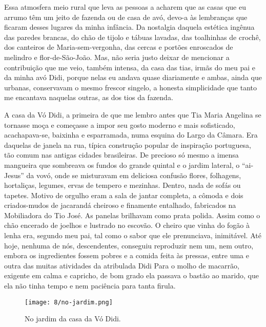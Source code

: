 Essa atmosfera meio rural que leva as pessoas a acharem que as casas que eu arrumo têm um jeito de fazenda ou de casa de avó, devo-a às lembranças que ficaram desses lugares da minha infância.
Da nostalgia daquela estética ingênua das paredes brancas, do chão de tijolo e tábuas lavadas, das toalhinhas de crochê, dos canteiros de Maria-sem-vergonha, das cercas e portões enroscados de melindro e flor-de-São-João.
Mas, não seria justo deixar de mencionar a contribuição que me veio, também intensa, da casa das tias, irmãs do meu pai e da minha avó Didi, porque nelas eu andava quase diariamente e ambas, ainda que urbanas, conservavam o mesmo frescor singelo, a honesta simplicidade que tanto me encantava naquelas outras, as dos tios da fazenda.


A casa da Vó Didi, a primeira de que me lembro antes que Tia Maria Angelina se tornasse moça e começasse a impor seu gosto moderno e mais sofisticado, acachapava-se, baixinha e esparramada, numa esquina do Largo da Câmara.
Era daquelas de janela na rua, típica construção popular de inspiração portuguesa, tão comum nas antigas cidades brasileiras.
De precioso só mesmo a imensa mangueira que sombreava os fundos do grande quintal e o jardim lateral, o ``ai-Jesus'' da vovó, onde se misturavam em deliciosa confusão flores, folhagens, hortaliças, legumes, ervas de tempero e mezinhas.
Dentro, nada de sofás ou tapetes.
Motivo de orgulho eram a sala de jantar completa, a cômoda e dois criados-mudos de jacarandá cheiroso e finamente entalhado, fabricados na Mobiliadora do Tio José.
As panelas brilhavam como prata polida.
Assim como o chão encerado de joelhos e lustrado no escovão.
O cheiro que vinha do fogão à lenha era, segundo meu pai, tal como o sabor que ele prenunciava, inimitável.
Até hoje, nenhuma de nós, descendentes, conseguiu reproduzir nem um, nem outro, embora os ingredientes fossem pobres e a comida feita às pressas, entre uma e outra das muitas atividades da atribulada Didi
Para o molho de macarrão, exigente em calma e capricho, de bom grado ela passava o bastão ao marido, que ela não tinha tempo e nem paciência para tanta firula.

\begin{figure}[H]
\centering
\texttt{[image: 8/no-jardim.png]}
\caption{No jardim da casa da Vó Didi.}
\end{figure}

